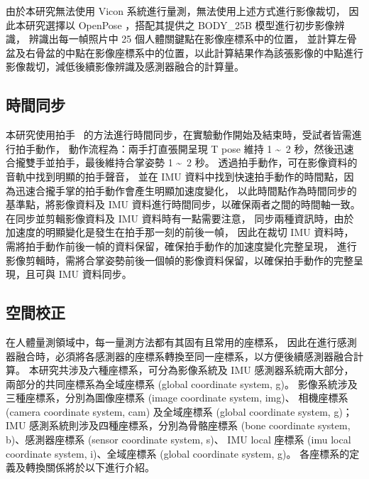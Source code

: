 由於本研究無法使用 Vicon 系統進行量測，無法使用上述方式進行影像裁切，
因此本研究選擇以 OpenPose ，搭配其提供之 BODY\_25B 模型進行初步影像辨識，
辨識出每一幀照片中 25 個人體關鍵點在影像座標系中的位置，
並計算左骨盆及右骨盆的中點在影像座標系中的位置，以此計算結果作為該張影像的中點進行影像裁切，減低後續影像辨識及感測器融合的計算量。

\subsection{時間同步}
本研究使用拍手~\cite{pons2012data} 的方法進行時間同步，在實驗動作開始及結束時，受試者皆需進行拍手動作，
動作流程為：兩手打直張開呈現 T pose 維持 1 \textasciitilde\ 2 秒，然後迅速合攏雙手並拍手，最後維持合掌姿勢 1 \textasciitilde\ 2 秒。
透過拍手動作，可在影像資料的音軌中找到明顯的拍手聲音，
並在 IMU 資料中找到快速拍手動作的時間點，因為迅速合攏手掌的拍手動作會產生明顯加速度變化，
以此時間點作為時間同步的基準點，將影像資料及 IMU 資料進行時間同步，以確保兩者之間的時間軸一致。
在同步並剪輯影像資料及 IMU 資料時有一點需要注意，
同步兩種資訊時，由於加速度的明顯變化是發生在拍手那一刻的前後一幀，
因此在裁切 IMU 資料時，需將拍手動作前後一幀的資料保留，確保拍手動作的加速度變化完整呈現，
進行影像剪輯時，需將合掌姿勢前後一個幀的影像資料保留，以確保拍手動作的完整呈現，且可與 IMU 資料同步。

\subsection{空間校正}
在人體量測領域中，每一量測方法都有其固有且常用的座標系，
因此在進行感測器融合時，必須將各感測器的座標系轉換至同一座標系，以方便後續感測器融合計算。
本研究共涉及六種座標系，可分為影像系統及 IMU 感測器系統兩大部分，兩部分的共同座標系為全域座標系 (global coordinate system, g)。
影像系統涉及三種座標系，分別為圖像座標系 (image coordinate system, img)、
相機座標系 (camera coordinate system, cam) 及全域座標系 (global coordinate system, g)；
IMU 感測系統則涉及四種座標系，分別為骨骼座標系 (bone coordinate system, b)、感測器座標系 (sensor coordinate system, s)、
IMU local 座標系 (imu local coordinate system, i)、全域座標系 (global coordinate system, g)。
各座標系的定義及轉換關係將於以下進行介紹。

